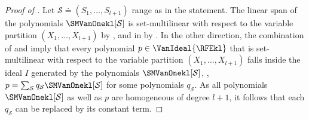 \begin{proof}[Proof of ]
    Let $\mathcal{S} \doteq (S_1, \dots, S_{l+1})$ range as in the statement. The linear span of the polynomials $\SMVanOnekl[\mathcal{S}]$ is set-multilinear with respect to the variable partition $(X_1, \dots, X_{l+1})$ by , and in \VanIdeal{\RFEkl} by 
    . 
    In the other direction, the combination of  and  imply that every polynomial $p \in \VanIdeal{\RFEkl}$ that is set-multilinear with respect to the variable partition $(X_1, \dots, X_{l+1})$ falls inside the ideal $I$ generated by the polynomials $\SMVanOnekl[\mathcal{S}]$, \ie, $p = \sum_{\mathcal{S}} q_{\mathcal{S}} \SMVanOnekl[\mathcal{S}]$ for some polynomials $q_{\mathcal{S}}$.
    As all polynomials $\SMVanOnekl[\mathcal{S}]$ as well as $p$ are homogeneous of degree $l+1$, it follows that each $q_{\mathcal{S}}$ can be replaced by its constant term. 
\end{proof}